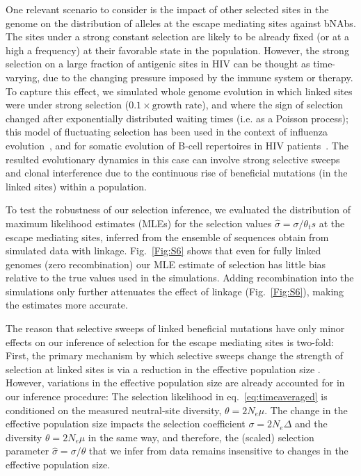 \documentclass[11pt]{article}
\begin{document}
One relevant scenario to consider is the impact of other selected sites in the genome on  the distribution of alleles at the escape mediating sites against bNAbs. The sites under a strong constant selection are likely to be already fixed (or at a high a frequency) at their favorable state in the population. However, the strong selection on a large fraction of antigenic sites in HIV can be thought as time-varying, due to the changing pressure imposed by the immune system or therapy. To capture this effect,   we simulated whole genome evolution in which  linked sites were under strong selection ($0.1 \times \text{growth rate}$), and where the sign of selection changed after exponentially distributed waiting times (i.e. as a Poisson process); this model of fluctuating selection has been used in the context of influenza evolution~\cite{Strelkowa:2012jo}, and for somatic evolution of B-cell repertoires in HIV patients~\cite{Nourmohammad:2019ij}.  
The resulted evolutionary dynamics in  this case can involve strong selective sweeps and clonal interference due to the continuous rise of beneficial mutations  (in the linked sites) within a population. 

To test the robustness of our selection inference, we evaluated the distribution of maximum likelihood estimates (MLEs) for the selection values  $\hat{\sigma} = \sigma / \theta_ts$ at the escape mediating sites, inferred from the ensemble of sequences obtain from  simulated data with linkage. Fig.~\ref{Fig:S6} shows that even for fully linked genomes (zero recombination) our MLE estimate of selection has little bias relative to the true values used in the simulations. Adding recombination into the simulations only further attenuates the effect of linkage (Fig.~\ref{Fig:S6}), making the estimates more accurate.

The reason that selective sweeps of linked beneficial mutations have only minor  effects on our inference of selection for the escape mediating sites  is two-fold: First, the primary mechanism by which selective sweeps change the strength of selection at linked sites is via a reduction in the effective population size \cite{hillEffectLinkageLimits1966, comeronHillRobertsonEffect2008}.
However, variations in the effective population size are already accounted for in our inference procedure: The selection likelihood in eq.~\ref{eq:timeaveraged} is conditioned on the measured neutral-site diversity, $\theta = 2 N_e \mu$. The change in the effective population size impacts the selection coefficient $\sigma = 2 N_e \Delta$ and the diversity $\theta=2 N_e \mu$  in the same way, and therefore, the  (scaled) selection parameter $\hat{\sigma} = \sigma/\theta$ that we infer from data remains insensitive to changes in the effective population size.
\end{document}
